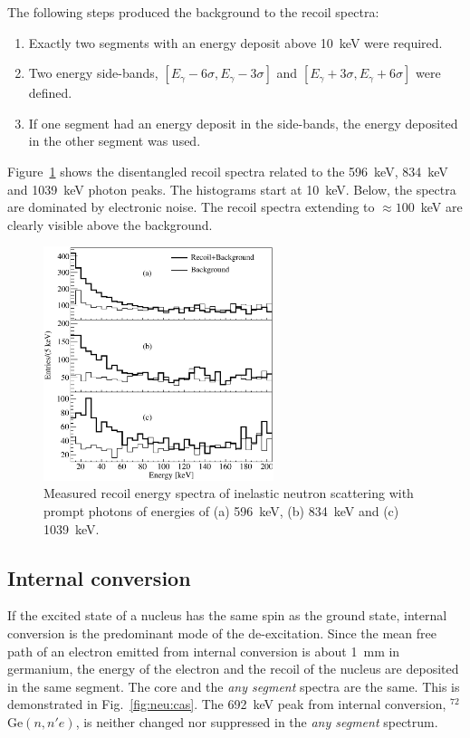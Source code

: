 The following steps produced the background to the recoil spectra:
\begin{enumerate}
\item Exactly two segments with an energy deposit above 10~keV were required.
\item Two energy side-bands, $[E_\gamma-6\sigma, E_\gamma-3\sigma]$ and $[E_\gamma+3\sigma, E_\gamma+6\sigma]$ were defined.
\item If one segment had an energy deposit in the side-bands, the energy deposited in the other segment was used.
\end{enumerate}

Figure~\ref{fig:neu:recoil} shows the disentangled recoil spectra related to the 596~keV, 834~keV and 1039~keV photon peaks. The histograms start at 10~keV. Below, the spectra are dominated by electronic noise. The recoil spectra extending to $\approx 100$~keV are clearly visible above the background.

\begin{figure}[tbhp]
\centering
\includegraphics[width=0.6\textwidth]{recoil}
\caption{Measured recoil energy spectra of inelastic neutron scattering with prompt photons of energies of (a) 596~keV, (b) 834~keV and (c) 1039~keV.}
\label{fig:neu:recoil}
\end{figure}

\subsection{Internal conversion}
\label{sec:neu:conv}
If the excited state of a nucleus has the same spin as the ground state, internal conversion \cite{Lis69, Kra56} is the predominant mode of the de-excitation. Since the mean free path of an electron emitted from internal conversion is about 1~mm in germanium, the energy of the electron and the recoil of the nucleus are deposited in the same segment. The core and the \emph{any segment} spectra are the same. This is demonstrated in Fig.~\ref{fig:neu:cas}. The 692~keV peak from internal conversion, $^{72}$Ge$(n,n'e)$, is neither changed nor suppressed in the \emph{any segment} spectrum.

